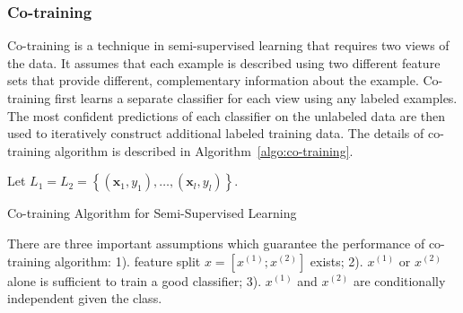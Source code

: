 \documentclass{article}
\begin{document}
\subsubsection{Co-training}
Co-training \cite{blum1998combining} is a technique in semi-supervised learning that requires two
views of the data. It assumes that each example is described using two
different feature sets that provide different, complementary
information about the example. Co-training first learns a separate
classifier for each view using any labeled examples. The most
confident predictions of each classifier on the unlabeled data are
then used to iteratively construct additional labeled training
data. The details of co-training algorithm is described in Algorithm~\ref{algo:co-training}.
\begin{algorithm}[h] \label{algo:co-training}
Let $L_1 = L_2 = \left \{ (\mathbf{x}_1, y_1), \ldots, (\mathbf{x}_l, y_l)
\right \}.$ \\

\caption{Co-training Algorithm for Semi-Supervised Learning}
\end{algorithm}

There are three important assumptions which guarantee the performance of
co-training algorithm: 1). feature split $x=[x^{(1)};x^{(2)}]$
exists; 2). $x^{(1)}$ or $x^{(2)}$ alone is sufficient to train a good
classifier; 3). $x^{(1)}$ and $x^{(2)}$ are conditionally independent
given the class.
\end{document}

